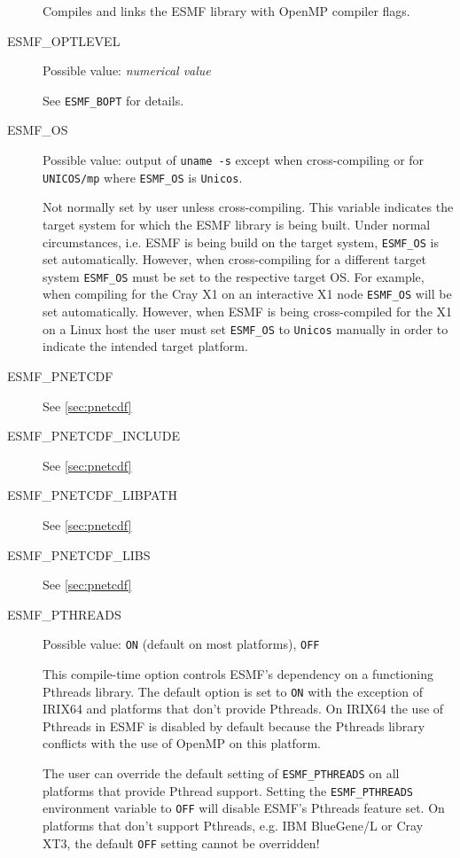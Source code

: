 \begin{description}
Compiles and links the ESMF library with OpenMP compiler flags.

\item[ESMF\_OPTLEVEL] 
Possible value: {\em numerical value}

See {\tt ESMF\_BOPT} for details.

\item[ESMF\_OS]
Possible value: output of {\tt uname -s} except when cross-compiling or for
{\tt UNICOS/mp} where {\tt ESMF\_OS} is {\tt Unicos}.

Not normally set by user unless cross-compiling. This variable indicates the
target system for which the ESMF library is being built. Under normal
circumstances, i.e. ESMF is being build on the target system, {\tt ESMF\_OS} is
set automatically. However, when cross-compiling for a different target system
{\tt ESMF\_OS} must be set to the respective target OS. For example, when
compiling for the Cray X1 on an interactive X1 node {\tt ESMF\_OS} will be set
automatically. However, when ESMF is being cross-compiled for the X1 on a Linux
host the user must set {\tt ESMF\_OS} to {\tt Unicos} manually in order to
indicate the intended target platform.

\item[ESMF\_PNETCDF]
See \ref{sec:pnetcdf}

\item[ESMF\_PNETCDF\_INCLUDE]
See \ref{sec:pnetcdf}

\item[ESMF\_PNETCDF\_LIBPATH]
See \ref{sec:pnetcdf}

\item[ESMF\_PNETCDF\_LIBS]
See \ref{sec:pnetcdf}

\item[ESMF\_PTHREADS]
Possible value: {\tt ON} (default on most platforms), {\tt OFF}

This compile-time option controls ESMF's dependency on a functioning
Pthreads library. The default option is set to {\tt ON} with the exception
of IRIX64 and platforms that don't provide Pthreads. On IRIX64 the use of
Pthreads in ESMF is disabled by default because the Pthreads library conflicts
with the use of OpenMP on this platform.

The user can override the default setting of {\tt ESMF\_PTHREADS} on all
platforms that provide Pthread support. Setting the {\tt ESMF\_PTHREADS}
environment variable to {\tt OFF} will disable ESMF's Pthreads feature set.
On platforms that don't support Pthreads, e.g. IBM BlueGene/L or Cray XT3, the
default {\tt OFF} setting cannot be overridden!
 

\end{description}

